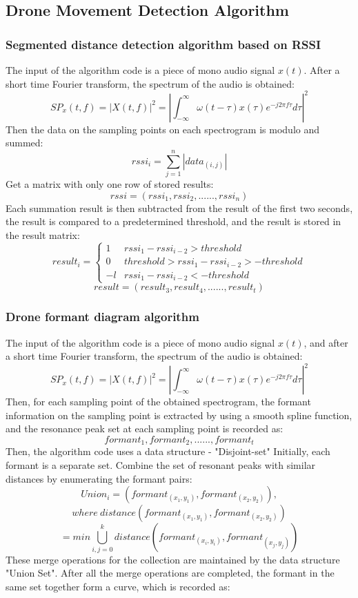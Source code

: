 \documentclass{sig-alternate-10pt}
\begin{document}
\subsection{Drone Movement Detection Algorithm}
\subsubsection{Segmented distance detection algorithm based on RSSI}
The input of the algorithm code is a piece of mono audio signal $x(t)$. After a short time Fourier transform, the spectrum of the audio is obtained:
$$SP_x(t,f)=|X(t,f)|^2=|\int_{-\infty}^\infty\omega(t-\tau)x(\tau)e^{-j2\pi f\tau}d\tau|^2$$
Then the data on the sampling points on each spectrogram is modulo and summed:
$$rssi_i=\sum_{j=1}^n|data_{(i,j)}|$$
Get a matrix with only one row of stored results:
$$rssi=(rssi_1,rssi_2,......,rssi_n)$$
Each summation result is then subtracted from the result of the first two seconds, the result is compared to a predetermined threshold, and the result is stored in the result matrix:
$$
result_i = \left\{ \begin{array}{ll}
1 & \textrm{$rssi_1-rssi_{i-2}>threshold$}\\
0 & \textrm{$threshold>rssi_1-rssi_{i-2}>-threshold$}\\
-l & \textrm{$rssi_1-rssi_{i-2}<-threshold$}
\end{array} \right.
$$
$$result=(result_3,result_4,......,result_t)$$
\subsubsection{Drone formant diagram algorithm}
The input of the algorithm code is a piece of mono audio signal $x(t)$, and after a short time Fourier transform, the spectrum of the audio is obtained:
$$SP_x(t,f)=|X(t,f)|^2=|\int_{-\infty}^\infty\omega(t-\tau)x(\tau)e^{-j2\pi f\tau}d\tau|^2$$
Then, for each sampling point of the obtained spectrogram, the formant information on the sampling point is extracted by using a smooth spline function, and the resonance peak set at each sampling point is recorded as:
$$formant_1,formant_2,......,formant_t$$
Then, the algorithm code uses a data structure - "Disjoint-set" Initially, each formant is a separate set. Combine the set of resonant peaks with similar distances by enumerating the formant pairs:
$$Union_i=(formant_{(x_1,y_1)},formant_{(x_2,y_2)}),$$
$$where\ distance(formant_{(x_1,y_1)},formant_{(x_2,y_2)})$$
$$=min\bigcup_{i,j=0}^k distance(formant_{(x_i,y_i)},formant_{(x_j,y_j)})$$
These merge operations for the collection are maintained by the data structure "Union Set". After all the merge operations are completed, the formant in the same set together form a curve, which is recorded as:
\end{document}
